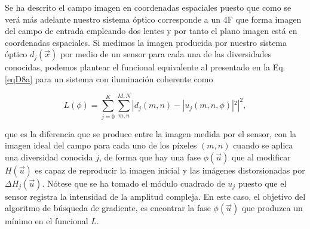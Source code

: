 Se ha descrito el campo imagen en coordenadas espaciales puesto que como se verá más adelante nuestro sistema óptico corresponde a un 4F que forma imagen del campo de entrada empleando dos lentes y por tanto el plano imagen está en coordenadas espaciales. Si medimos la imagen producida por nuestro sistema óptico $d_j(\vec{x})$ por medio de un sensor para cada una de las diversidades conocidas, podemos plantear el funcional equivalente al presentado en la Eq. \ref{eqD8a} para un sistema con iluminación coherente \cite{Paxman1992, Echeverri2015} como

\begin{equation}
\label{eqDfunc}
L(\phi) = \sum\limits_{j=0}^{K} \sum\limits_{m,n}^{M,N} |d_j(m,n) - |u_j(m,n,\phi)|^2|^2,
\end{equation}

que es la diferencia que se produce entre la imagen medida por el sensor, con la imagen ideal del campo para cada uno de los píxeles $(m,n)$ cuando se aplica una diversidad conocida $j$, de forma que hay una fase $\phi(\vec{u})$ que al modificar $H(\vec{u})$ es capaz de reproducir la imagen inicial y las imágenes distorsionadas por $\Delta H_j(\vec{u})$. Nótese que se ha tomado el módulo cuadrado de $u_j$ puesto que el sensor registra la intensidad de la amplitud compleja. En este caso, el objetivo del algoritmo de búsqueda de gradiente, es encontrar la fase $\phi(\vec{u})$ que produzca un mínimo en el funcional $L$.\\








